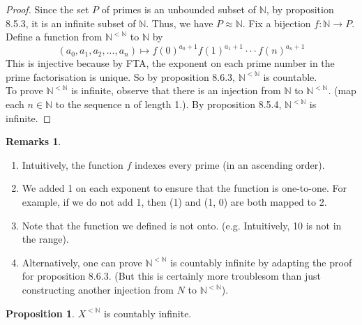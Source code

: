 \documentclass[14pt]{article}
\theoremstyle{definition}
\newtheorem*{remark}{Remarks}
\newtheorem{proposition}[definition]{Proposition}
\newcommand{\fun}[3]{#1\colon #2\rightarrow#3}
\newcommand{\bb}[1]{\mathbb{#1}}
\begin{document}
\begin{proof}
    Since the set $P$ of primes is an unbounded subset of $\bb{N}$, by proposition 8.5.3, it is an infinite subset of $\bb{N}$. Thus, 
    we have $P\approx \bb{N}$.
    Fix a bijection $\fun{f}{\bb{N}}{P}$. Define a function from $\bb{N}^{<\bb{N}}$ to $\bb{N}$ by
    \begin{equation*}
        (a_0, a_1, a_2,..., a_n)\mapsto f(0)^{a_0+1}f(1)^{a_1+1}\cdot\cdot\cdot f(n)^{a_n+1}
    \end{equation*}
    This is injective because by FTA, the exponent on each prime number in the prime factorisation is unique. So by proposition 8.6.3, $\bb{N}^{<\bb{N}}$ is countable. \\
    To prove  $\bb{N}^{<\bb{N}}$ is infinite, observe that there is an injection from $\bb{N}$ to $\bb{N}^{<\bb{N}}$.
    (map each $n\in\bb{N}$ to the sequence {n} of length 1.). By proposition 8.5.4, $\bb{N}^{<\bb{N}}$ is infinite.
\end{proof}
\begin{remark}\hfill
    \begin{enumerate}
        \item  Intuitively, the function $f$ indexes every prime (in an ascending order).
        \item  We added 1 on each exponent to ensure that the function is one-to-one. For example,
        if we do not add 1, then (1) and (1, 0) are both mapped to 2.
        \item  Note that the function we defined is not onto. (e.g. Intuitively, 10 is not in the range).
        \item Alternatively, one can prove $\bb{N}^{<\bb{N}}$ is countably infinite by adapting the proof for 
        proposition 8.6.3. (But this is certainly more troublesom than just constructing another 
        injection from $N$ to $\bb{N}^{<\bb{N}}$).
    \end{enumerate}
\end{remark}

\vspace{2mm}

\begin{proposition}
    $X^{<\bb{N}}$ is countably infinite.
\end{proposition}
\end{document}
